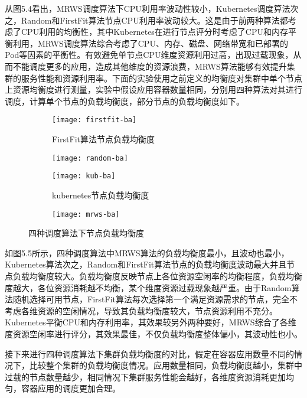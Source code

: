 从图5.4看出，MRWS调度算法下CPU利用率波动性较小，Kubernetes调度算法次之，Random和FirstFit算法节点CPU利用率波动较大。这是由于前两种算法都考虑了CPU利用的均衡性，其中Kubernetes在进行节点评分时考虑了CPU和内存平衡利用，MRWS调度算法综合考虑了CPU、内存、磁盘、网络带宽和已部署的Pod等因素的平衡性。有效避免单节点CPU维度资源利用过高，出现过载现象，从而不能调度更多的应用，造成其他维度的资源浪费，MRWS算法能够有效提升集群的服务性能和资源利用率。下面的实验使用之前定义的均衡度对集群中单个节点上资源均衡度进行测量，实验中假设应用容器数量相同，分别用四种算法对其进行调度，计算单个节点的负载均衡度，部分节点的负载均衡度如下。

\begin{figure}[H]
	\centering%
	\begin{subfigure}{7cm}
		\texttt{[image: firstfit-ba]}
		\caption{FirstFit算法节点负载均衡度}
	\end{subfigure}%
	\hspace{0.5cm}%
	\begin{subfigure}{7cm}
		\texttt{[image: random-ba]}
	\end{subfigure}
	\begin{subfigure}{7cm}
		\texttt{[image: kub-ba]}
		\caption{kubernetes节点负载均衡度}
	\end{subfigure}%
	\hspace{0.5cm}%
	\begin{subfigure}{7cm}
		\texttt{[image: mrws-ba]}
	\end{subfigure}
	\caption{四种调度算法下节点负载均衡度}
	
\end{figure}

如图5.5所示，四种调度算法中MRWS算法的负载均衡度最小，且波动也最小，Kubernetes算法次之，Random和FirstFit算法节点的负载均衡度波动最大并且节点负载均衡度较大。负载均衡度反映节点上各位资源空闲率的均衡程度，负载均衡度越大，各位资源消耗越不均衡，某个维度资源过载现象越严重。由于Random算法随机选择可用节点，FirstFit算法每次选择第一个满足资源需求的节点，完全不考虑各维资源的空闲情况，导致其负载均衡度较大，节点资源利用不充分。Kubernetes平衡CPU和内存利用率，其效果较另外两种要好，MRWS综合了各维度资源空闲率进行评分，其效果最佳，不仅负载均衡度整体偏小，其波动性也小。

接下来进行四种调度算法下集群负载均衡度的对比，假定在容器应用数量不同的情况下，比较整个集群的负载均衡度情况。应用数量相同，负载均衡度越小，集群中过载的节点数量越少，相同情况下集群服务性能会越好，各维度资源消耗更加均匀，容器应用的调度更加合理。

